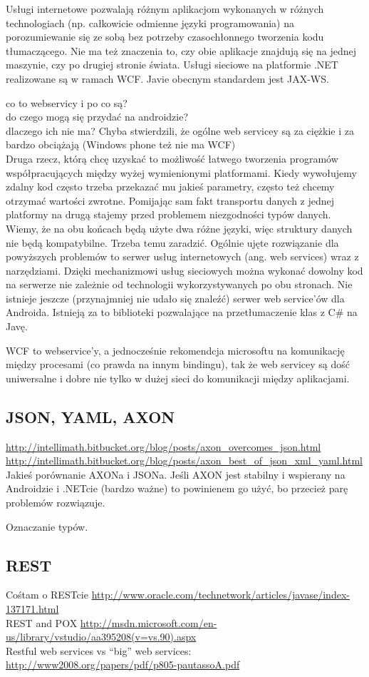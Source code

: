 Usługi internetowe pozwalają różnym aplikacjom wykonanych w różnych technologiach (np. całkowicie odmienne języki programowania) na porozumiewanie się ze sobą bez potrzeby czasochłonnego tworzenia kodu tłumaczącego. Nie ma też znaczenia to, czy obie aplikacje znajdują się na jednej maszynie, czy po drugiej stronie świata.
Usługi sieciowe na platformie .NET realizowane są w ramach WCF. Javie obecnym standardem jest JAX-WS.

co to webservicy i po co są?\\
do czego mogą się przydać na androidzie?\\
dlaczego ich nie ma? Chyba stwierdzili, że ogólne web servicey są za ciężkie i za bardzo obciążają (Windows phone też nie ma WCF)\\

Druga rzecz, którą chcę uzyskać to możliwość łatwego tworzenia programów współpracujących między wyżej wymienionymi platformami. Kiedy wywołujemy zdalny kod często trzeba przekazać mu jakieś parametry, często też chcemy otrzymać wartości zwrotne. Pomijając sam fakt transportu danych z jednej platformy na drugą stajemy przed problemem niezgodności typów danych. Wiemy, że na obu końcach będą użyte dwa różne języki, więc struktury danych nie będą kompatybilne. Trzeba temu zaradzić.
Ogólnie ujęte rozwiązanie dla powyższych problemów to serwer usług internetowych (ang. web services) wraz z narzędziami. Dzięki mechanizmowi usług sieciowych można wykonać dowolny kod na serwerze nie zależnie od technologii wykorzystywanych po obu stronach. Nie istnieje jeszcze (przynajmniej nie udało się znaleźć) serwer web service’ów dla Androida. Istnieją za to biblioteki pozwalające na przetłumaczenie klas z C\# na Javę.

WCF to webservice'y, a jednocześnie rekomendcja microsoftu na komunikację między procesami (co prawda na innym bindingu), tak że web servicey są dość uniwersalne i dobre nie tylko w dużej sieci do komunikacji między aplikacjami.

\subsection{JSON, YAML, AXON}
\url{http://intellimath.bitbucket.org/blog/posts/axon_overcomes_json.html}\\
\url{http://intellimath.bitbucket.org/blog/posts/axon_best_of_json_xml_yaml.html}\\
Jakieś porównanie AXONa i JSONa. Jeśli AXON jest stabilny i wspierany na Androidzie i .NETcie (bardzo ważne) to powinienem go użyć, bo przecież parę problemów rozwiązuje.

Oznaczanie typów.

\subsection{REST}
Cośtam o RESTcie \url{http://www.oracle.com/technetwork/articles/javase/index-137171.html}\\
REST and POX \url{http://msdn.microsoft.com/en-us/library/vstudio/aa395208(v=vs.90).aspx}\\

Restful web services vs ``big'' web services: \url{http://www2008.org/papers/pdf/p805-pautassoA.pdf}\\
